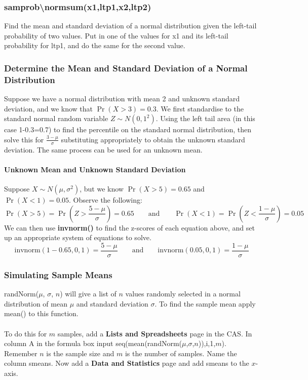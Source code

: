 \documentclass[a4paper,twoside,10pt]{article}
\begin{document}
			\subsubsection{sam\textunderscore prob\textbackslash normsum(x1,ltp1,x2,ltp2)}
			Find the mean and standard deviation of a normal distribution given the left-tail probability of two values. Put in one of the values for x1 and its left-tail probability for ltp1, and do the same for the second value.
			
			\subsubsection{Determine the Mean and Standard Deviation of a Normal Distribution}
				Suppose we have a normal distribution with mean 2 and unknown standard deviation, and we know that $\Pr(X>3)=0.3$. We first standardise to the standard normal random variable $Z\sim N(0,1^2)$. Using the left tail area (in this case 1-0.3=0.7) to find the percentile on the standard normal distribution, then solve this for $\displaystyle \frac{3-\mu}{\sigma}$ substituting appropriately to obtain the unknown standard deviation. The same process can be used for an unknown mean.
				\paragraph{Unknown Mean and Unknown Standard Deviation}
				Suppose $X\sim N(\mu,\sigma^2)$, but we know $\Pr(X>5)=0.65$ and $\Pr(X<1)=0.05$. Observe the following:
				\[
				\Pr(X>5)=\Pr\left(Z>\frac{5-\mu}{\sigma}\right)=0.65 \qquad \text{and} \qquad \Pr(X<1)=\Pr\left(Z<\frac{1-\mu}{\sigma}\right)=0.05
				\]
				We can then use \textbf{invnorm()} to find the z-scores of each equation above, and set up an appropriate system of equations to solve.
				\[
				\mathrm{invnorm}(1-0.65,0,1)=\frac{5-\mu}{\sigma} \qquad \text{and} \qquad \mathrm{invnorm}(0.05,0,1)=\frac{1-\mu}{\sigma}
				\]
			
			\subsubsection{Simulating Sample Means}
				randNorm($\mu$, $\sigma$, $n$) will give a list of $n$ values randomly selected in a normal distribution of mean $\mu$ and standard deviation $\sigma$. To find the sample mean apply mean() to this function.\\\\
				To do this for $m$ samples, add a \textbf{Lists and Spreadsheets} page in the CAS. In column A in the formula box input seq(mean(randNorm($\mu$,$\sigma$,$n$)),i,1,$m$). Remember $n$ is the sample size and $m$ is the number of samples. Name the column smeans. Now add a \textbf{Data and Statistics} page and add smeans to the $x$-axis.
			
\end{document}

